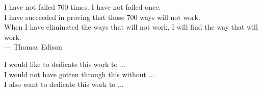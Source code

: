 \thispagestyle{empty}

\vspace*{5cm}

\begin{center}
	I have not failed 700 times. I have not failed once. \\
	I have succeeded in proving that those 700 ways will not work. \\
	When I have eliminated the ways that will not work, I will find the way that will work.\\ \medskip
	--- Thomas Edison
\end{center}

\bigskip
\bigskip

\begin{center}
    I would like to dedicate this work to ...\\ 
	I would not have gotten through this without ... \\
	I also want to dedicate this work to ... \\ \medskip
\end{center}
